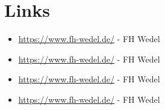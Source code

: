 \documentclass[a4paper,parskip=half,oneside]{scrbook}
\begin{document}
\chapter{Links}

\begin{itemize}
  \item \url{https://www.fh-wedel.de/} - FH Wedel
  \item \url{https://www.fh-wedel.de/} - FH Wedel
  \item \url{https://www.fh-wedel.de/} - FH Wedel
  \item \url{https://www.fh-wedel.de/} - FH Wedel
\end{itemize}
\end{document}
